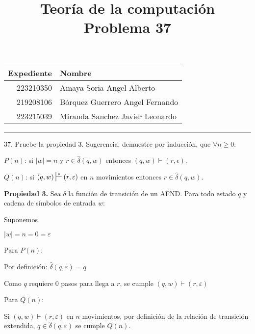 \documentclass[a4paper, 12pt]{article}
\title
{
  Teoría de la computación \\
  Problema 37
}
\begin{document}
\maketitle

\begin{center}
    \begin{tabular}{r|l}
        \textbf{Expediente} & \textbf{Nombre} \\ \hline
        223210350 & Amaya Soria Angel Alberto \\
        219208106 & Bórquez Guerrero Angel Fernando \\
        223215039 & Miranda Sanchez Javier Leonardo \\
    \end{tabular}
\end{center}

\rule{\linewidth}{0.3mm}

\vspace{0.3cm}

37. Pruebe la propiedad 3. Sugerencia: demuestre por inducción, que $\forall n \geq 0$:

\par $P(n)$: si $|w| = n$ y $r \in \hat{\delta}(q, w)$ entonces $(q, w) \vdash (r, \epsilon)$.
\par $Q(n)$: si $(q, w) \sststile{}{*} (r, \varepsilon)$ en $n$ movimientos entonces $r \in \hat{\delta}(q, w)$.

\vspace{0.5cm}
\par \textbf {Propiedad 3.} Sea $\delta$ la función de transición de un AFND. Para todo estado $q$ y cadena de símbolos de entrada $w$:
\begin{center}
    \par {}
\end{center}

\par { \large \color{azul} Suponemos}
\par $|w| = n = 0 = \varepsilon$
\par Para $P(n)$:
\par Por definición: $\hat{\delta}(q, \varepsilon) = q$
\par Como $q$ requiere 0 pasos para llega a $r$, se cumple $(q, w) \vdash (r, \varepsilon)$
\vspace{0.2cm}
\par Para $Q(n)$:
\par Si $(q, w) \vdash (r, \varepsilon)$ en $n$ movimientos, por definición de la relación de transición extendida, $q \in \hat{\delta}(q, \varepsilon)$ se cumple $Q(n)$.
\end{document}
